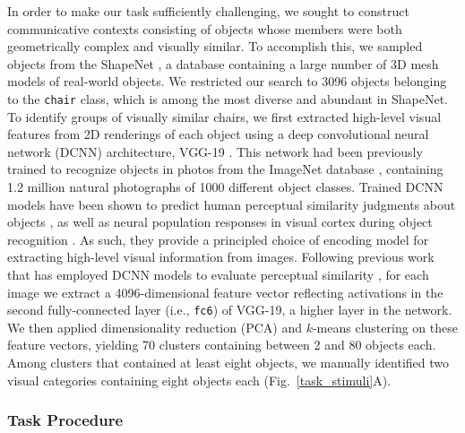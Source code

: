 \documentclass[10pt,letterpaper]{article}
\begin{document}
In order to make our task sufficiently challenging, we sought to construct communicative contexts consisting of objects whose members were both geometrically complex and visually similar.
To accomplish this, we sampled objects from the ShapeNet \cite{chang2015shapenet}, a database containing a large number of 3D mesh models of real-world objects. %
We restricted our search to 3096 objects belonging to the \texttt{chair} class, which is among the most diverse and abundant in ShapeNet.
To identify groups of visually similar chairs, we first extracted high-level visual features from 2D renderings of each object using a deep convolutional neural network (DCNN) architecture, VGG-19 \cite{simonyan2014very}.
This network had been previously trained to recognize objects in photos from the ImageNet database \cite{deng2009imagenet}, containing 1.2 million natural photographs of 1000 different object classes.
Trained DCNN models have been shown to predict human perceptual similarity judgments about objects \cite{kubilius2016deep,peterson2018evaluating}, as well as neural population responses in visual cortex during object recognition \cite{yamins2014performance,gucclu2015deep}.
As such, they provide a principled choice of encoding model for extracting high-level visual information from images.
Following previous work that has employed DCNN models to evaluate perceptual similarity \cite{FanCommon2018,peterson2018evaluating,kubilius2016deep}, for each image we extract a 4096-dimensional feature vector reflecting activations in the second fully-connected layer (i.e., \texttt{fc6}) of VGG-19, a higher layer in the network.
We then applied dimensionality reduction (PCA) and $k$-means clustering on these feature vectors, yielding 70 clusters containing between 2 and 80 objects each.
Among clusters that contained at least eight objects, we manually identified two visual categories containing eight objects each (Fig.~\ref{task_stimuli}A).

\subsubsection{Task Procedure}
\end{document}
